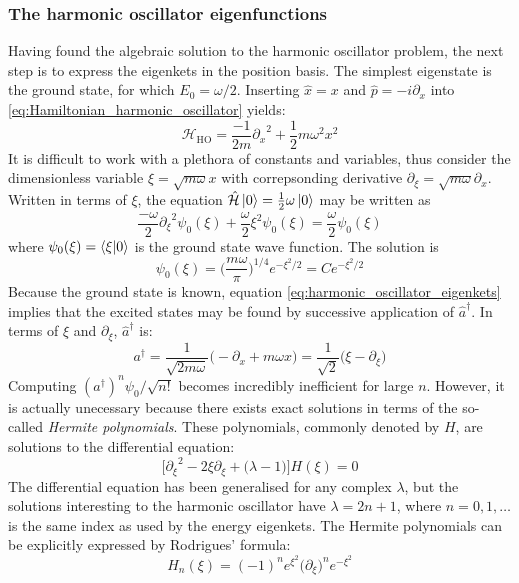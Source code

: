 \documentclass[nofootinbib,reprint,english]{revtex4-1}
\newcommand{\hatHH}{\hat{\mathcal{H}}}
\newcommand{\HH}{\mathcal{H}}
\begin{document}
\subsubsection{The harmonic oscillator eigenfunctions}
Having found the algebraic solution to the harmonic oscillator problem, the next step is to express the eigenkets in the position basis. The simplest eigenstate is the ground state, for which \(E_0=\omega/2\). Inserting \(\hat{x}=x\) and \(\hat{p}=-i\partial_x\) into \eqref{eq:Hamiltonian_harmonic_oscillator} yields:
\[\HH_\text{HO}=\frac{-1}{2m}{\partial_x}^2+\frac{1}{2}m\omega^2x^2\]
It is difficult to work with a plethora of constants and variables, thus consider the dimensionless variable \(\xi=\sqrt{m\omega}x\) with correpsonding derivative \(\partial_\xi=\sqrt{m\omega}\partial_x\). Written in terms of \(\xi\), the equation \(\hatHH\ket{0}=\frac{1}{2}\omega\ket{0}\) may be written as
\[\frac{-\omega}{2}{\partial_\xi}^2\psi_0(\xi)+\frac{\omega}{2}\xi^2\psi_0(\xi)=\frac{\omega}{2}\psi_0(\xi)\]
where \(\psi_0(\xi)=\braket{\xi}{0}\) is the ground state wave function. The solution is
\begin{equation}\label{eq:harmonic_oscillator_ground_state_position_basis}
\psi_0(\xi)=\bigg(\frac{m\omega}{\pi}\bigg)^{1/4}e^{-\xi^2/2}=Ce^{-\xi^2/2}
\end{equation}
Because the ground state is known, equation \eqref{eq:harmonic_oscillator_eigenkets} implies that the excited states may be found by successive application of \(\hat{a}^\dagger\). In terms of \(\xi\) and \(\partial_\xi\), \(\hat{a}^\dagger\) is:
\[a^\dagger=\frac{1}{\sqrt{2m\omega}}\big(-\partial_x+m\omega x\big)=\frac{1}{\sqrt{2}}\big(\xi-\partial_\xi\big)\]
Computing \((a^\dagger)^n\psi_0/\sqrt{n!}\) becomes incredibly inefficient for large \(n\). However, it is actually unecessary because there exists exact solutions in terms of the so-called \emph{Hermite polynomials}. These polynomials, commonly denoted by \(H\), are solutions to the differential equation:
\begin{equation}\label{eq:Hermite_differential_equation}
\bigg[{\partial_\xi}^2-2\xi\partial_\xi+\big(\lambda-1\big)\bigg]H(\xi)=0
\end{equation}
The differential equation has been generalised for any complex \(\lambda\), but the solutions interesting to the harmonic oscillator have \(\lambda=2n+1\), where \(n=0,1,\ldots\) is the same index as used by the energy eigenkets. The Hermite polynomials can be explicitly expressed by Rodrigues' formula:
\begin{equation}\label{eq:Hermite_polynomials_Rodrigues_Formula}
H_n(\xi)=(-1)^ne^{\xi^2}\big(\partial_\xi\big)^ne^{-\xi^2}
\end{equation}
\end{document}
